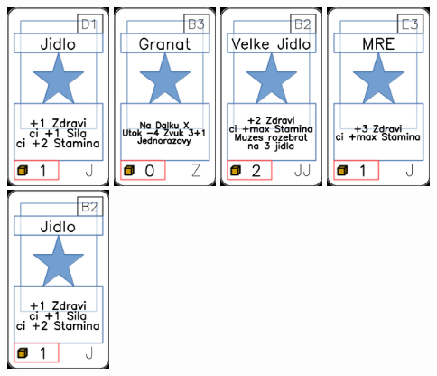 \documentclass[a4paper]{article}
\begin{document}
	\includegraphics[width=3.0cm]{img-1_15}
	\includegraphics[width=3.0cm]{img-1_97}
	\includegraphics[width=3.0cm]{img-1_36}
	\includegraphics[width=3.0cm]{img-1_22}
	\includegraphics[width=3.0cm]{img-1_6}
\end{document}
